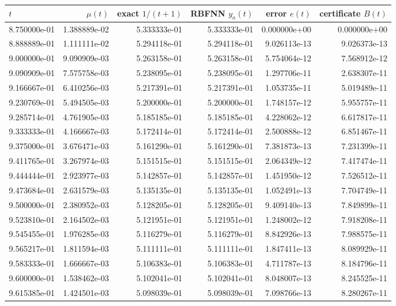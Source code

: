 \begin{tabular}{lrrrrr}
\toprule
$t$ & $\mu(t)$ & exact $1/(t+1)$ & RBFNN $y_a(t)$ & error $e(t)$ & certificate $B(t)$ \\
\midrule
8.750000e-01 & 1.388889e-02 & 5.333333e-01 & 5.333333e-01 & 0.000000e+00 & 0.000000e+00 \\
8.888889e-01 & 1.111111e-02 & 5.294118e-01 & 5.294118e-01 & 9.026113e-13 & 9.026373e-13 \\
9.000000e-01 & 9.090909e-03 & 5.263158e-01 & 5.263158e-01 & 5.754064e-12 & 7.568912e-12 \\
9.090909e-01 & 7.575758e-03 & 5.238095e-01 & 5.238095e-01 & 1.297706e-11 & 2.638307e-11 \\
9.166667e-01 & 6.410256e-03 & 5.217391e-01 & 5.217391e-01 & 1.053735e-11 & 5.019489e-11 \\
9.230769e-01 & 5.494505e-03 & 5.200000e-01 & 5.200000e-01 & 1.748157e-12 & 5.955757e-11 \\
9.285714e-01 & 4.761905e-03 & 5.185185e-01 & 5.185185e-01 & 4.228062e-12 & 6.617817e-11 \\
9.333333e-01 & 4.166667e-03 & 5.172414e-01 & 5.172414e-01 & 2.500888e-12 & 6.851467e-11 \\
9.375000e-01 & 3.676471e-03 & 5.161290e-01 & 5.161290e-01 & 7.381873e-13 & 7.231399e-11 \\
9.411765e-01 & 3.267974e-03 & 5.151515e-01 & 5.151515e-01 & 2.064349e-12 & 7.417474e-11 \\
9.444444e-01 & 2.923977e-03 & 5.142857e-01 & 5.142857e-01 & 1.451950e-12 & 7.526512e-11 \\
9.473684e-01 & 2.631579e-03 & 5.135135e-01 & 5.135135e-01 & 1.052491e-13 & 7.704749e-11 \\
9.500000e-01 & 2.380952e-03 & 5.128205e-01 & 5.128205e-01 & 9.409140e-13 & 7.849899e-11 \\
9.523810e-01 & 2.164502e-03 & 5.121951e-01 & 5.121951e-01 & 1.248002e-12 & 7.918208e-11 \\
9.545455e-01 & 1.976285e-03 & 5.116279e-01 & 5.116279e-01 & 8.842926e-13 & 7.988575e-11 \\
9.565217e-01 & 1.811594e-03 & 5.111111e-01 & 5.111111e-01 & 1.847411e-13 & 8.089929e-11 \\
9.583333e-01 & 1.666667e-03 & 5.106383e-01 & 5.106383e-01 & 4.711787e-13 & 8.184796e-11 \\
9.600000e-01 & 1.538462e-03 & 5.102041e-01 & 5.102041e-01 & 8.048007e-13 & 8.245525e-11 \\
9.615385e-01 & 1.424501e-03 & 5.098039e-01 & 5.098039e-01 & 7.098766e-13 & 8.280267e-11 \\

\end{tabular}

